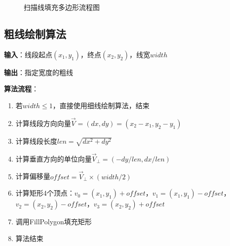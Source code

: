 \documentclass[12pt,a4paper]{article}
\begin{document}
\begin{tcolorbox}
\begin{figure}[H]
\caption{扫描线填充多边形流程图}
\label{fig:scanline_fill_flow}
\end{figure}

\clearpage

\end{tcolorbox}
\begin{tcolorbox}
\subsection{粗线绘制算法}

\textbf{输入}：线段起点$(x_1, y_1)$，终点$(x_2, y_2)$，线宽$width$

\textbf{输出}：指定宽度的粗线

\textbf{算法流程}：
\begin{enumerate}
    \item 若$width \leq 1$，直接使用细线绘制算法，结束
    \item 计算线段方向向量$\vec{V} = (dx, dy) = (x_2-x_1, y_2-y_1)$
    \item 计算线段长度$len = \sqrt{dx^2 + dy^2}$
    \item 计算垂直方向的单位向量$\vec{V}_{\perp} = (-dy/len, dx/len)$
    \item 计算偏移量$offset = \vec{V}_{\perp} \times (width/2)$
    \item 计算矩形4个顶点：$v_0 = (x_1, y_1) + offset$，$v_1 = (x_1, y_1) - offset$，$v_2 = (x_2, y_2) - offset$，$v_3 = (x_2, y_2) + offset$
    \item 调用FillPolygon填充矩形
    \item 算法结束
\end{enumerate}


\end{tcolorbox}
\end{document}
